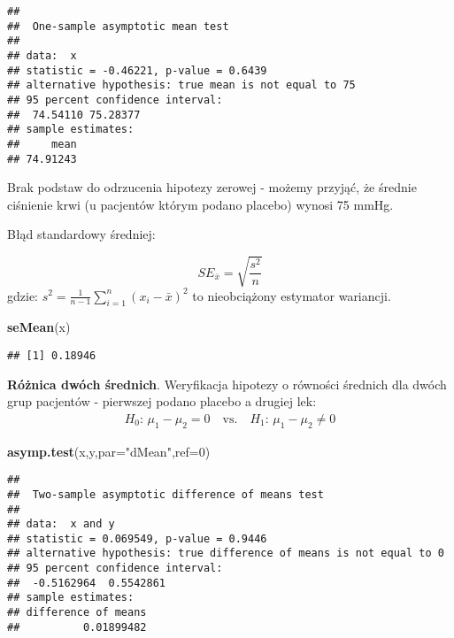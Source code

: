 \documentclass[polish,]{book}
\newenvironment{Shaded}{\begin{snugshade}}{\end{snugshade}}
\newcommand{\DataTypeTok}[1]{\textcolor[rgb]{0.13,0.29,0.53}{#1}}
\newcommand{\DecValTok}[1]{\textcolor[rgb]{0.00,0.00,0.81}{#1}}
\newcommand{\KeywordTok}[1]{\textcolor[rgb]{0.13,0.29,0.53}{\textbf{#1}}}
\newcommand{\NormalTok}[1]{#1}
\newcommand{\StringTok}[1]{\textcolor[rgb]{0.31,0.60,0.02}{#1}}
\begin{document}
\begin{verbatim}
## 
##  One-sample asymptotic mean test
## 
## data:  x
## statistic = -0.46221, p-value = 0.6439
## alternative hypothesis: true mean is not equal to 75
## 95 percent confidence interval:
##  74.54110 75.28377
## sample estimates:
##     mean 
## 74.91243
\end{verbatim}

Brak podstaw do odrzucenia hipotezy zerowej - możemy przyjąć, że średnie ciśnienie krwi (u pacjentów którym podano placebo) wynosi 75 mmHg.

Błąd standardowy średniej:

\begin{equation}
SE_{\bar{x}}=\sqrt{\frac{s^2}{n}}
\label{eq:wz1139}
\end{equation}
gdzie: \(s^2=\frac{1}{n-1}\sum_{i=1}^{n}(x_i-\bar{x})^2\) to nieobciążony estymator wariancji.

\begin{Shaded}
\begin{Highlighting}[]
\KeywordTok{seMean}\NormalTok{(x)}
\end{Highlighting}
\end{Shaded}

\begin{verbatim}
## [1] 0.18946
\end{verbatim}

\textbf{Różnica dwóch średnich}. Weryfikacja hipotezy o równości średnich dla dwóch grup pacjentów - pierwszej podano placebo a drugiej lek:
\[
\begin{array}{ll}
H_0:\,\mu_1-\mu_2 = 0\quad\mbox{vs.}\quad H_1:\,\mu_1-\mu_2 \neq 0
\end{array}
\]

\begin{Shaded}
\begin{Highlighting}[]
\KeywordTok{asymp.test}\NormalTok{(x,y,}\DataTypeTok{par=}\StringTok{"dMean"}\NormalTok{,}\DataTypeTok{ref=}\DecValTok{0}\NormalTok{)}
\end{Highlighting}
\end{Shaded}

\begin{verbatim}
## 
##  Two-sample asymptotic difference of means test
## 
## data:  x and y
## statistic = 0.069549, p-value = 0.9446
## alternative hypothesis: true difference of means is not equal to 0
## 95 percent confidence interval:
##  -0.5162964  0.5542861
## sample estimates:
## difference of means 
##          0.01899482
\end{verbatim}
\end{document}
